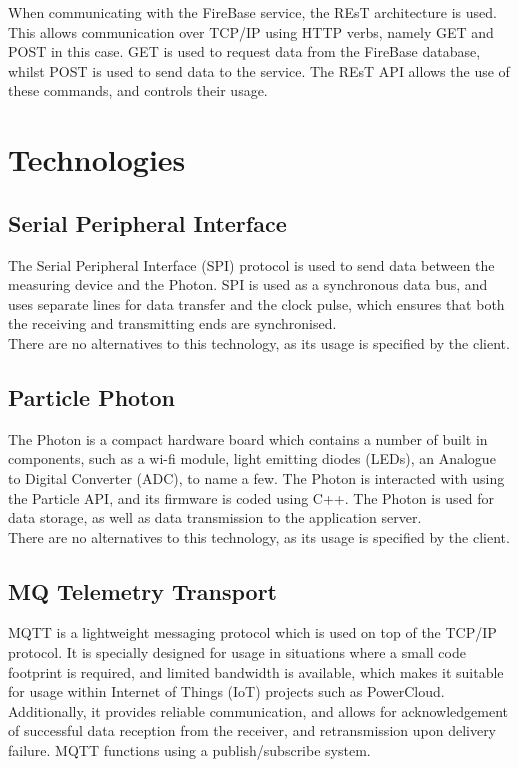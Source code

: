 \documentclass{article}
\begin{document}
	When communicating with the FireBase service, the REsT architecture is used. This allows communication over TCP/IP using HTTP verbs, namely GET and POST in this case. GET is used to request data from the FireBase database, whilst POST is used to send data to the service. The REsT API allows the use of these commands, and controls their usage.

\newpage

\section{Technologies}

	\subsection{Serial Peripheral Interface}
	
	The Serial Peripheral Interface (SPI) protocol is used to send data between the measuring device and the Photon. SPI is used as a synchronous data bus, and uses separate lines for data transfer and the clock pulse, which ensures that both the receiving and transmitting ends are synchronised.\\
	
	\noindent
	There are no alternatives to this technology, as its usage is specified by the client.
	
	\subsection{Particle Photon}
	
	The Photon is a compact hardware board which contains a number of built in components, such as a wi-fi module, light emitting diodes (LEDs), an Analogue to Digital Converter (ADC), to name a few. The Photon is interacted with using the Particle API, and its firmware is coded using C++. The Photon is used for data storage, as well as data transmission to the application server.\\
	
	\noindent
	There are no alternatives to this technology, as its usage is specified by the client.
	
	\subsection{MQ Telemetry Transport}
	
	MQTT is a lightweight messaging protocol which is used on top of the TCP/IP protocol. It is specially designed for usage in situations where a small code footprint is required, and limited bandwidth is available, which makes it suitable for usage within Internet of Things (IoT) projects such as PowerCloud. Additionally, it provides reliable communication, and allows for acknowledgement of successful data reception from the receiver, and retransmission upon delivery failure. MQTT functions using a publish/subscribe system.
	
\end{document}
